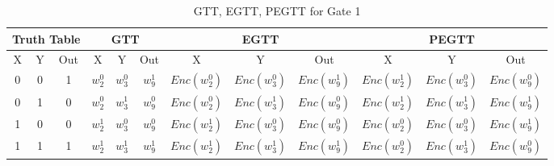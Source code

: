 \documentclass[times]{article}
\begin{document}
	\begin{table}
		\centering
		\caption{GTT, EGTT, PEGTT for Gate 1}
		\label{tab:gtt1}
		\begin{adjustbox}{width=1\textwidth}
		\begin{tabular}{|c|c|c||c|c|c||c|c|c||c|c|c|}
			\hline
			\multicolumn{3}{|c||}{Truth Table} 		& 
				\multicolumn{3}{|c||}{GTT}			& 
					\multicolumn{3}{|c||}{EGTT} 		& 
						\multicolumn{3}{|c|}{PEGTT} \\
			\hline
			\hline
			X & Y & Out	& 
				X & Y & Out	& 
					X & Y & Out	& 
						X & Y & Out	\\
			\hline
			0 & 0 & 1 	&
				$w_{2}^0$	& $w_{3}^0$	& $w_{9}^1$	& 
					$Enc(w_{2}^0)$	& $Enc(w_{3}^0)$	& $Enc(w_{9}^1)$ &
						$Enc(w_{2}^1)$	& $Enc(w_{3}^0)$	& $Enc(w_{9}^0)$ \\
			\hline
			0 & 1 & 0 	&
				$w_{2}^0$	& $w_{3}^1$	& $w_{9}^0$	& 
					$Enc(w_{2}^0)$	& $Enc(w_{3}^1)$	& $Enc(w_{9}^0)$ &
						$Enc(w_{2}^1)$	& $Enc(w_{3}^1)$	& $Enc(w_{9}^1)$ \\
			\hline
			1 & 0 & 0 	&
				$w_{2}^1$	& $w_{3}^0$	& $w_{9}^0$	& 
					$Enc(w_{2}^1)$	& $Enc(w_{3}^0)$	& $Enc(w_{9}^0)$ &
						$Enc(w_{2}^0)$	& $Enc(w_{3}^0)$	& $Enc(w_{9}^1)$ \\
			\hline
			1 & 1 & 1 	&
				$w_{2}^1$	& $w_{3}^1$	& $w_{9}^1$	& 
					$Enc(w_{2}^1)$	& $Enc(w_{3}^1)$	& $Enc(w_{9}^1)$ &
						$Enc(w_{2}^0)$	& $Enc(w_{3}^1)$	& $Enc(w_{9}^0)$ \\
			\hline
		\end{tabular}
		\end{adjustbox}
	\end{table}
\end{document}
